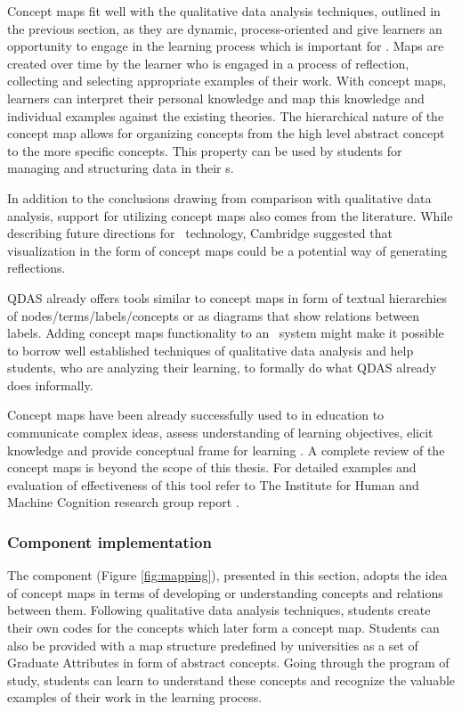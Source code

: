 Concept maps fit well with the qualitative data analysis techniques, outlined in
the previous section, as they are dynamic, process-oriented and give learners an
opportunity to engage in the learning process \citep{Mcaleese1998} which is
important for \LLLs \citep{Schuetze2006,Divjak2004}. Maps are created over time
by the learner who is engaged in a process of reflection, collecting and
selecting appropriate examples of their work. With concept maps, learners can
interpret their personal knowledge and map this knowledge and individual
examples against the existing theories. The hierarchical nature of the concept
map allows for organizing concepts from the high level abstract concept to the
more specific concepts. This property can be used by students for managing and
structuring data in their \ep s. 

In addition to the conclusions drawing from comparison with qualitative data
analysis, support for utilizing concept maps also comes from the literature.
While describing future directions for \ep~technology, Cambridge
\citeyearpar{Cambridge2010} suggested that visualization in the form of concept
maps could be a potential way of generating reflections.

QDAS already offers tools similar to concept maps in form of textual hierarchies
of nodes/terms/labels/concepts or as diagrams that show relations between
labels. Adding concept maps functionality to an \ep~system might make it
possible to borrow well established techniques of qualitative data analysis and
help students, who are analyzing their learning, to formally do what QDAS
already does informally. 

Concept maps have been already successfully used to in education to communicate
complex ideas, assess understanding of learning objectives, elicit knowledge and
provide conceptual frame for learning \citep{Novak2010}. A complete review of
the concept maps is beyond the scope of this thesis. For detailed examples and
evaluation of effectiveness of this tool refer to The Institute for Human and
Machine Cognition research group report \citep{Canas2003}.

\subsubsection{Component implementation}

The component (Figure \ref{fig:mapping}), presented in this section, adopts the
idea of concept maps in terms of developing or understanding concepts and
relations between them. Following qualitative data analysis techniques, students
create their own codes for the concepts which later form a concept map. Students
can also be provided with a map structure predefined by universities as a set of
Graduate Attributes in form of abstract concepts. Going through the program of
study, students can learn to understand these concepts and recognize the
valuable examples of their work in the learning process.

